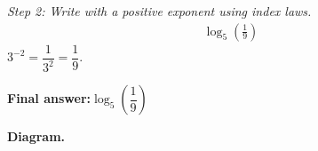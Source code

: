 \documentclass[11pt]{article}
\begin{document}
\textit{Step 2: Write with a positive exponent using index laws.}
\[\begin{gathered}
\log_5\!\left(\frac{1}{9}\right)
\end{gathered}\]
\( 3^{-2} = \dfrac{1}{3^2} = \dfrac{1}{9} \).

\begin{answerbox}
\textbf{Final answer:}\quad \(\displaystyle  \log_5\!\left(\dfrac{1}{9}\right) \)
\end{answerbox}
\textbf{Diagram.}

\begin{center}
\end{center}
\end{document}
